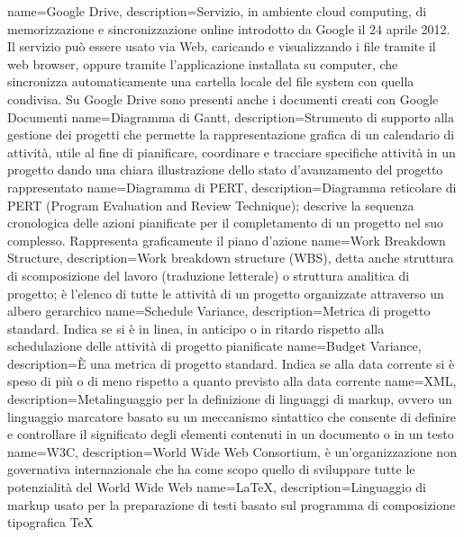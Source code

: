  {
	name=Google Drive,
	description={Servizio, in ambiente cloud computing, di memorizzazione e sincronizzazione
	online introdotto da Google il 24 aprile 2012. Il servizio può essere usato via Web, caricando
	e visualizzando i file tramite il web browser, oppure tramite l'applicazione installata su
	computer, che sincronizza automaticamente una cartella locale del file system con quella
	condivisa. Su Google Drive sono presenti anche i documenti creati con Google Documenti}
}
 {
	name=Diagramma di Gantt,
	description={Strumento di supporto alla gestione dei progetti che permette la rappresentazione
	grafica di un calendario di attività, utile al fine di pianificare, coordinare e tracciare
	specifiche attività in un progetto dando una chiara illustrazione dello stato d'avanzamento
	del progetto rappresentato}
}
 {
	name=Diagramma di PERT,
	description={Diagramma reticolare di PERT (Program Evaluation and Review Technique); descrive
	la sequenza cronologica delle azioni pianificate per il completamento di un progetto nel suo
	complesso. Rappresenta graficamente il piano d'azione}
}
 {
	name=Work Breakdown Structure,
	description={Work breakdown structure (WBS), detta anche struttura di scomposizione del lavoro
	(traduzione letterale) o struttura analitica di progetto; è l'elenco di tutte le attività di un
	progetto organizzate attraverso un albero gerarchico}
}
 {
	name=Schedule Variance,
	description={Metrica di progetto standard. Indica se si è in linea, in anticipo o in ritardo
	rispetto alla schedulazione delle attività di progetto pianificate}
}
 {
	name=Budget Variance,
	description={È una metrica di progetto standard. Indica se alla data corrente si è speso di
	più o di meno rispetto a quanto previsto alla data corrente}
}
 {
	name=XML,
	description={Metalinguaggio per la definizione di linguaggi di markup, ovvero un linguaggio
	marcatore basato su un meccanismo sintattico che consente di definire e controllare il
	significato degli elementi contenuti in un documento o in un testo}
}
 {
	name=W3C,
	description={World Wide Web Consortium, è un'organizzazione non governativa internazionale che
	ha come scopo quello di sviluppare tutte le potenzialità del World Wide Web}
}
 {
	name=LaTeX,
	description={Linguaggio di markup usato per la preparazione di testi basato sul programma di
	composizione tipografica TeX}
}
